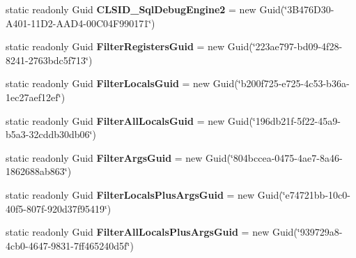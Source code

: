 \begin{DoxyCompactItemize}
\item 
\hypertarget{class_thread_watcher_1_1_g_u_i_ds_a36621dae8f3aca11b51394e0355336e6}{static readonly Guid {\bfseries C\+L\+S\+I\+D\+\_\+\+Sql\+Debug\+Engine2} = new Guid(\char`\"{}3\+B476\+D30-\/\+A401-\/11\+D2-\/\+A\+A\+D4-\/00\+C04\+F990171\char`\"{})}\label{class_thread_watcher_1_1_g_u_i_ds_a36621dae8f3aca11b51394e0355336e6}

\item 
\hypertarget{class_thread_watcher_1_1_g_u_i_ds_a4a5bdf9063c66e4fae03ce3f8665e568}{static readonly Guid {\bfseries Filter\+Registers\+Guid} = new Guid(\char`\"{}223ae797-\/bd09-\/4f28-\/8241-\/2763bdc5f713\char`\"{})}\label{class_thread_watcher_1_1_g_u_i_ds_a4a5bdf9063c66e4fae03ce3f8665e568}

\item 
\hypertarget{class_thread_watcher_1_1_g_u_i_ds_a3bd04b835a509b08bf7c3359ec161cec}{static readonly Guid {\bfseries Filter\+Locals\+Guid} = new Guid(\char`\"{}b200f725-\/e725-\/4c53-\/b36a-\/1ec27aef12ef\char`\"{})}\label{class_thread_watcher_1_1_g_u_i_ds_a3bd04b835a509b08bf7c3359ec161cec}

\item 
\hypertarget{class_thread_watcher_1_1_g_u_i_ds_aa3620a6b4b04b7ba97b34300bbb83b42}{static readonly Guid {\bfseries Filter\+All\+Locals\+Guid} = new Guid(\char`\"{}196db21f-\/5f22-\/45a9-\/b5a3-\/32cddb30db06\char`\"{})}\label{class_thread_watcher_1_1_g_u_i_ds_aa3620a6b4b04b7ba97b34300bbb83b42}

\item 
\hypertarget{class_thread_watcher_1_1_g_u_i_ds_a71ebd6305d138d521d5822fa08a9fa42}{static readonly Guid {\bfseries Filter\+Args\+Guid} = new Guid(\char`\"{}804bccea-\/0475-\/4ae7-\/8a46-\/1862688ab863\char`\"{})}\label{class_thread_watcher_1_1_g_u_i_ds_a71ebd6305d138d521d5822fa08a9fa42}

\item 
\hypertarget{class_thread_watcher_1_1_g_u_i_ds_ae5ad7b07fdaf13cf7177af0cb4fec544}{static readonly Guid {\bfseries Filter\+Locals\+Plus\+Args\+Guid} = new Guid(\char`\"{}e74721bb-\/10c0-\/40f5-\/807f-\/920d37f95419\char`\"{})}\label{class_thread_watcher_1_1_g_u_i_ds_ae5ad7b07fdaf13cf7177af0cb4fec544}

\item 
\hypertarget{class_thread_watcher_1_1_g_u_i_ds_ae28d6580b567d0853c5b3f7f86332e43}{static readonly Guid {\bfseries Filter\+All\+Locals\+Plus\+Args\+Guid} = new Guid(\char`\"{}939729a8-\/4cb0-\/4647-\/9831-\/7ff465240d5f\char`\"{})}\label{class_thread_watcher_1_1_g_u_i_ds_ae28d6580b567d0853c5b3f7f86332e43}


\end{DoxyCompactItemize}
